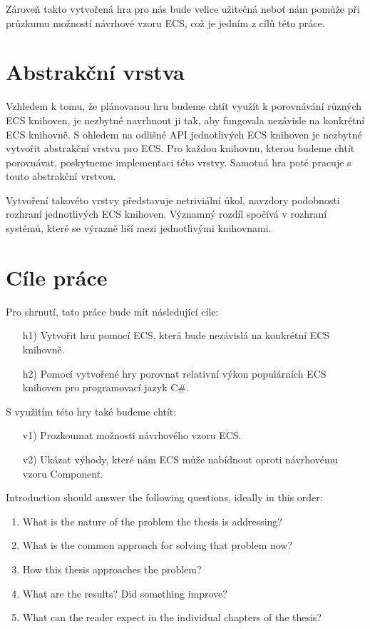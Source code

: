Zároveň takto vytvořená hra pro nás bude velice užitečná neboť nám pomůže při průzkumu možností návrhové vzoru ECS, což je jedním z cílů této práce.

\section{Abstrakční vrstva}
Vzhledem k tomu, že plánovanou hru budeme chtít využít k porovnávání různých ECS knihoven, je nezbytné navrhnout ji tak, aby fungovala nezávisle na konkrétní ECS knihovně. S ohledem na odlišné API jednotlivých ECS knihoven je nezbytné vytvořit abstrakční vrstvu pro ECS. Pro každou knihovnu, kterou budeme chtít porovnávat, poskytneme implementaci této vrstvy. Samotná hra poté pracuje s touto abstrakční vrstvou.

Vytvoření takovéto vrstvy představuje netriviální úkol, navzdory podobnosti rozhraní jednotlivých ECS knihoven. Významný rozdíl spočívá v rozhraní systémů, které se výrazně liší mezi jednotlivými knihovnami.

\section{Cíle práce}
Pro shrnutí, tato práce bude mít následující cíle:
\begin{enumerate}
    \item[h1)] Vytvořit hru pomocí ECS, která bude nezávislá na konkrétní ECS knihovně.
    \item[h2)] Pomocí vytvořené hry porovnat relativní výkon populárních ECS knihoven pro programovací jazyk C\#.
\end{enumerate}
S využitím této hry také budeme chtít:
\begin{enumerate}
    \item[v1)] Prozkoumat možnosti návrhového vzoru ECS.
    \item[v2)] Ukázat výhody, které nám ECS může nabídnout oproti návrhovému vzoru Component.
\end{enumerate}














\iffalse
{}

Introduction should answer the following questions, ideally in this order:
\begin{enumerate}
\item What is the nature of the problem the thesis is addressing?
\item What is the common approach for solving that problem now?
\item How this thesis approaches the problem?
\item What are the results? Did something improve?
\item What can the reader expect in the individual chapters of the thesis?
\end{enumerate}

